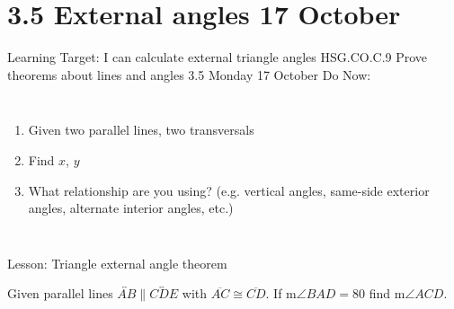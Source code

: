 \documentclass[onlytextwidth]{beamer}
\newcommand\paraticks{}
\def\paraticks{{Straight Barb[reversed, scale=2]}-{Straight Barb[scale=2]}}
\begin{document}
\section{3.5 External angles \hfill 17 October}
\begin{frame}{Learning Target: I can calculate external triangle angles}
  {HSG.CO.C.9 Prove theorems about lines and angles  \hfill \alert{3.5 Monday 17 October}}
  Do Now: 
  \begin{columns}
    \begin{enumerate}
      \item Given two parallel lines, two transversals
      \item Find $x$, $y$
      \item What relationship are you using? (e.g. vertical angles, same-side exterior angles, alternate interior angles, etc.)
    \end{enumerate}
  \end{columns}
  Lesson: Triangle external angle theorem
\end{frame}

\begin{frame}
  Given parallel lines $\overleftrightarrow{AB} \parallel \overleftrightarrow{CDE}$ with $\overline{AC} \cong \overline{CD}$. If m$\angle BAD=80$ find m$\angle ACD$.
  \begin{flushright}
  \end{flushright} \vspace{1cm}
  \end{frame}
\end{document}
